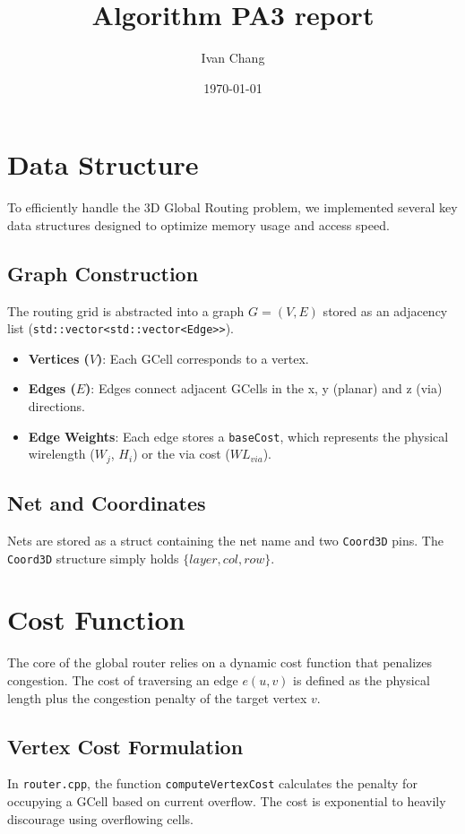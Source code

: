 \documentclass[a4paper,12pt]{article}
\title{Algorithm PA3 report}
\author{Ivan Chang}
\date{\today}
\begin{document}
\maketitle

\section{Data Structure}

To efficiently handle the 3D Global Routing problem, we implemented several key data structures designed to optimize memory usage and access speed.
\subsection{Graph Construction}
The routing grid is abstracted into a graph $G = (V, E)$ stored as an adjacency list (\texttt{std::vector<std::vector<Edge>>}).
\begin{itemize}
    \item \textbf{Vertices ($V$)}: Each GCell corresponds to a vertex.
    \item \textbf{Edges ($E$)}: Edges connect adjacent GCells in the x, y (planar) and z (via) directions.
    \item \textbf{Edge Weights}: Each edge stores a \texttt{baseCost}, which represents the physical wirelength ($W_j$, $H_i$) or the via cost ($WL_{via}$).
\end{itemize}

\subsection{Net and Coordinates}
Nets are stored as a struct containing the net name and two \texttt{Coord3D} pins. The \texttt{Coord3D} structure simply holds $\{layer, col, row\}$.

\section{Cost Function}

The core of the global router relies on a dynamic cost function that penalizes congestion. The cost of traversing an edge $e(u, v)$ is defined as the physical length plus the congestion penalty of the target vertex $v$.

\subsection{Vertex Cost Formulation}
In \texttt{router.cpp}, the function \texttt{computeVertexCost} calculates the penalty for occupying a GCell based on current overflow. The cost is exponential to heavily discourage using overflowing cells.
\end{document}
